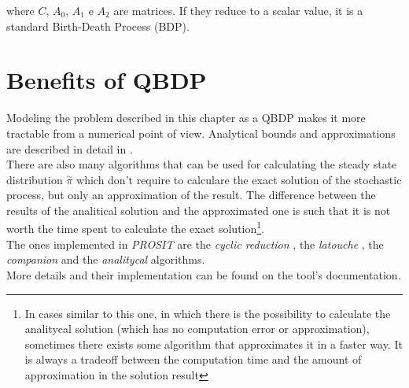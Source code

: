 where \( C \), \( A_{0} \), \( A_{1} \) e \( A_{2} \) are matrices. If they reduce to a scalar value, it is a standard Birth-Death Process (BDP).

\section{Benefits of QBDP} \label{benefits}
Modeling the problem described in this chapter as a QBDP makes it more tractable from a numerical point of view. Analytical bounds and approximations are described in detail in \cite{probGuarantees}.\\
There are also many algorithms that can be used for calculating the steady state distribution \( \overset{\sim}{\pi} \) which don't require to calculare the exact solution of the stochastic process, but only an approximation of the result. The difference between the results of the analitical solution and the approximated one is such that it is not worth the time spent to calculate the exact solution\footnote{In cases similar to this one, in which there is the possibility to calculate the analitycal solution (which has no computation error or approximation), sometimes there exists some algorithm that approximates it in a faster way. It is always a tradeoff between the computation time and the amount of approximation in the solution result}.\\
The ones implemented in \emph{PROSIT} are the \emph{cyclic reduction} \cite{cyclic}, the \emph{latouche} \cite{latouche}, the \emph{companion} \cite{probGuarantees} and the \emph{analitycal} \cite{probGuarantees} algorithms.\\
More details and their implementation can be found on the tool's documentation.